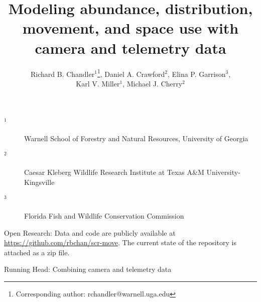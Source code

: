 \documentclass[12pt]{article}
\begin{document}
\title{Modeling abundance, distribution, movement, and space
  use with camera and telemetry data}
\author{Richard B. Chandler$^1$\footnote{Corresponding author: rchandler@warnell.uga.edu}, Daniel A. Crawford$^2$, Elina P. Garrison$^3$, \\
  Karl V. Miller$^1$, Michael J. Cherry$^2$}

\maketitle

\vspace{12pt}

\begin{description}%
\item[$^1$] Warnell School of Forestry and Natural Resources, University of Georgia %
\item[$^2$] Caesar Kleberg Wildlife Research Institute at Texas A\&M University-Kingsville %
\item[$^3$] Florida Fish and Wildlife Conservation Commission %
\end{description}


\vspace{24pt}

Open Research: Data and code are publicly available at
\url{https://github.com/rbchan/scr-move}. The current state of the
repository is attached as a zip file.  

Running Head: Combining camera and telemetry data


\clearpage


\linenumbers
\doublespacing
\end{document}
